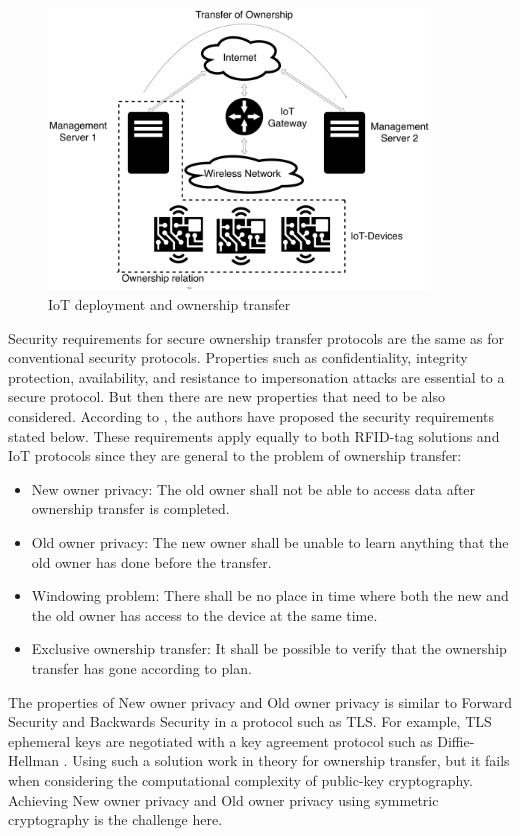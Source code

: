 \begin{figure}[h]
\centering
\includegraphics[width=0.9\textwidth]{images/IoT_OT.pdf}
\caption{IoT deployment and ownership transfer}
\label{fig:iot-ot}
\end{figure}


Security requirements for secure ownership transfer protocols are the same as for conventional security protocols. Properties such as confidentiality, integrity protection, availability, and resistance to impersonation attacks are essential to a secure protocol. But then there are new properties that need to be also considered. According to \cite{taqieddin2018tag}, the authors have proposed the security requirements stated below. These requirements apply equally to both RFID-tag solutions and IoT protocols since they are general to the problem of ownership transfer:
\begin{itemize}
    \item New owner privacy: The old owner shall not be able to access data after ownership transfer is completed.
    \item Old owner privacy: The new owner shall be unable to learn anything that the old owner has done before the transfer.
    \item Windowing problem: There shall be no place in time where both the new and the old owner has access to the device at the same time.
    \item Exclusive ownership transfer: It shall be possible to verify that the ownership transfer has gone according to plan.
\end{itemize}
The properties of New owner privacy and Old owner privacy is similar to Forward Security and Backwards Security in a protocol such as TLS. For example, TLS ephemeral keys are negotiated with a key agreement protocol such as Diffie-Hellman \cite{diffie1976new}. Using such a solution work in theory for ownership transfer, but it fails when considering the computational complexity of public-key cryptography. Achieving New owner privacy and Old owner privacy using symmetric cryptography is the challenge here. 

